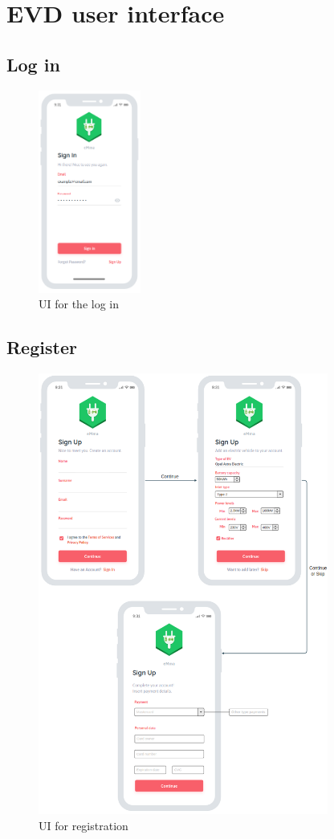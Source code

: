 \section{EVD user interface}
\subsection{Log in}
\begin{figure}[H]
    \centering
    \includegraphics[width=0.3\textwidth]{Images/cp3/logInMockup.png}
    \caption{UI for the log in}
\end{figure}

\subsection{Register}
\begin{figure}[H]
    \centering
    \includegraphics[width=0.85\textwidth]{Images/cp3/registerMockup.png}
    \caption{UI for registration}
\end{figure}

